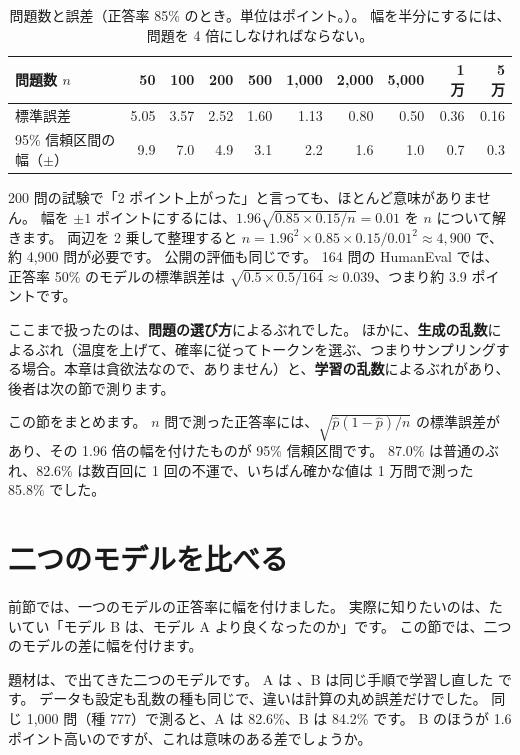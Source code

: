 \begin{table}[tbp]
\centering
\caption{問題数と誤差（正答率 85\% のとき。単位はポイント。）。
幅を半分にするには、問題を 4 倍にしなければならない。}
\label{tab:es-n}
\small
\begin{tabular}{lrrrrrrrrr}
\toprule
問題数 $n$ & 50 & 100 & 200 & 500 & 1,000 & 2,000 & 5,000 & 1 万 & 5 万 \\
\midrule
標準誤差 & 5.05 & 3.57 & 2.52 & 1.60 & 1.13 & 0.80 & 0.50 & 0.36 & 0.16 \\
95\% 信頼区間の幅（$\pm$） & 9.9 & 7.0 & 4.9 & 3.1 & 2.2 & 1.6 & 1.0 & 0.7 & 0.3 \\
\bottomrule
\end{tabular}
\end{table}

200 問の試験で「2 ポイント上がった」と言っても、ほとんど意味がありません。
幅を $\pm1$ ポイントにするには、$1.96\sqrt{0.85\times0.15/n}=0.01$ を $n$ について解きます。
両辺を 2 乗して整理すると $n=1.96^2\times0.85\times0.15/0.01^2\approx4{,}900$ で、約 4,900 問が必要です。
公開の評価も同じです。
164 問の HumanEval では、正答率 50\% のモデルの標準誤差は $\sqrt{0.5\times0.5/164}\approx0.039$、つまり約 3.9 ポイントです。

ここまで扱ったのは、\textbf{問題の選び方}によるぶれでした。
ほかに、\textbf{生成の乱数}によるぶれ（温度を上げて、確率に従ってトークンを選ぶ、つまりサンプリングする場合。本章は貪欲法なので、ありません）と、\textbf{学習の乱数}によるぶれがあり、後者は次の節で測ります。

この節をまとめます。
$n$ 問で測った正答率には、$\sqrt{\hat p(1-\hat p)/n}$ の標準誤差があり、その 1.96 倍の幅を付けたものが 95\% 信頼区間です。
87.0\% は普通のぶれ、82.6\% は数百回に 1 回の不運で、いちばん確かな値は 1 万問で測った 85.8\% でした。

\section{二つのモデルを比べる}\label{sec:es-compare}

前節では、一つのモデルの正答率に幅を付けました。
実際に知りたいのは、たいてい「モデル B は、モデル A より良くなったのか」です。
この節では、二つのモデルの差に幅を付けます。

題材は、で出てきた二つのモデルです。
A は 、B は同じ手順で学習し直した  です。
データも設定も乱数の種も同じで、違いは計算の丸め誤差だけでした。
同じ 1,000 問（種 777）で測ると、A は 82.6\%、B は 84.2\% です。
B のほうが 1.6 ポイント高いのですが、これは意味のある差でしょうか。

